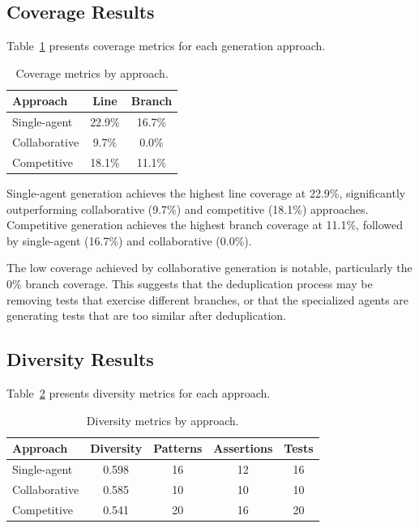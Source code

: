 \documentclass[11pt]{article}
\begin{document}
\subsection{Coverage Results}

Table~\ref{tab:coverage} presents coverage metrics for each generation approach.

\begin{table}[h]
\centering
\small
\begin{tabular}{lcc}
\toprule
\textbf{Approach} & \textbf{Line} & \textbf{Branch} \\
\midrule
Single-agent & 22.9\% & 16.7\% \\
Collaborative & 9.7\% & 0.0\% \\
Competitive & 18.1\% & 11.1\% \\
\bottomrule
\end{tabular}
\caption{Coverage metrics by approach.}
\label{tab:coverage}
\end{table}

Single-agent generation achieves the highest line coverage at 22.9\%, significantly outperforming collaborative (9.7\%) and competitive (18.1\%) approaches. Competitive generation achieves the highest branch coverage at 11.1\%, followed by single-agent (16.7\%) and collaborative (0.0\%).

The low coverage achieved by collaborative generation is notable, particularly the 0\% branch coverage. This suggests that the deduplication process may be removing tests that exercise different branches, or that the specialized agents are generating tests that are too similar after deduplication.

\subsection{Diversity Results}

Table~\ref{tab:diversity} presents diversity metrics for each approach.

\begin{table}[h]
\centering
\small
\begin{tabular}{lcccc}
\toprule
\textbf{Approach} & \textbf{Diversity} & \textbf{Patterns} & \textbf{Assertions} & \textbf{Tests} \\
\midrule
Single-agent & 0.598 & 16 & 12 & 16 \\
Collaborative & 0.585 & 10 & 10 & 10 \\
Competitive & 0.541 & 20 & 16 & 20 \\
\bottomrule
\end{tabular}
\caption{Diversity metrics by approach.}
\label{tab:diversity}
\end{table}
\end{document}
